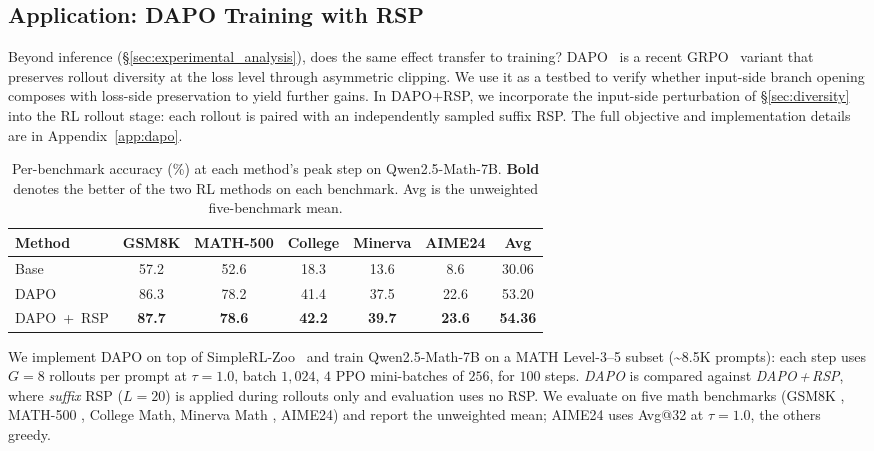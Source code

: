 
\subsection{Application: DAPO Training with RSP}\label{sec:application}

Beyond inference (\S\ref{sec:experimental_analysis}), does the same effect transfer to training? DAPO~\citep{yu2025dapo} is a recent GRPO~\citep{shao2024deepseekmath} variant that preserves rollout diversity at the loss level through asymmetric clipping. We use it as a testbed to verify whether input-side branch opening composes with loss-side preservation to yield further gains. In DAPO+RSP, we incorporate the input-side perturbation of \S\ref{sec:diversity} into the RL rollout stage: each rollout is paired with an independently sampled suffix RSP. The full objective and implementation details are in Appendix~\ref{app:dapo}.

\begin{table}[!ht]
\centering
\caption{Per-benchmark accuracy (\%) at each method's peak step on Qwen2.5-Math-7B. \textbf{Bold} denotes the better of the two RL methods on each benchmark. Avg is the unweighted five-benchmark mean.}
\label{tab:dapo_peak}
\footnotesize
\setlength{\tabcolsep}{6pt}
\renewcommand{\arraystretch}{0.9}
\begin{tabular}{l ccccc c}
\toprule
\textbf{Method} & \textbf{GSM8K} & \textbf{MATH-500} & \textbf{College} & \textbf{Minerva} & \textbf{AIME24} & \textbf{Avg} \\
\midrule
Base                & 57.2 & 52.6 & 18.3 & 13.6 & 8.6  & 30.06 \\
DAPO                & 86.3 & 78.2 & 41.4 & 37.5 & 22.6 & 53.20 \\
\rowcolor{blue!10}
DAPO~+~RSP          & \textbf{87.7} & \textbf{78.6} & \textbf{42.2} & \textbf{39.7} & \textbf{23.6} & \textbf{54.36} \\
\bottomrule
\end{tabular}
\end{table}

We implement DAPO on top of SimpleRL-Zoo~\citep{zeng2025simplerl} and train Qwen2.5-Math-7B on a MATH Level-3--5 subset (\textasciitilde 8.5K prompts): each step uses $G=8$ rollouts per prompt at $\tau{=}1.0$, batch $1{,}024$, $4$ PPO mini-batches of $256$, for $100$ steps. \emph{DAPO} is compared against \emph{DAPO\,+\,RSP}, where \emph{suffix} RSP ($L{=}20$) is applied during rollouts only and evaluation uses no RSP. We evaluate on five math benchmarks (GSM8K \citep{cobbe2021training}, MATH-500 \citep{lightman2024lets}, College Math, Minerva Math \citep{lewkowycz2022minerva}, AIME24) and report the unweighted mean; AIME24 uses Avg@32 at $\tau{=}1.0$, the others greedy.

